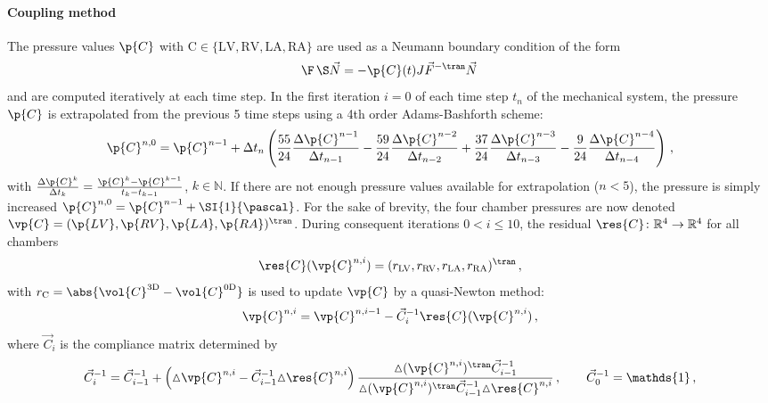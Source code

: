 \paragraph{Coupling method} The pressure values $\p{C}$ with $\mathrm{C} \in \{\mathrm{LV,RV,LA,RA}\}$ are used as a Neumann boundary condition of the form
\begin{equation}
    \F\,\S \vec N = -\p{C}(t) J \vec F^{-\tran} \vec N \,
\end{equation}
and are computed iteratively at each time step.
In the first iteration $i=0$ of each time step $t_n$ of the mechanical system, the pressure $\p{C}$ is extrapolated from the previous 5 time steps using a 4th order Adams-Bashforth scheme:
\begin{equation} 
    \label{eq:circextrapolation}
    \p{C}^{n,0} = \p{C}^{n-1} + \Delta t_n\left(
    \frac{55}{24}\frac{\Delta \p{C}^{n-1}}{\Delta t_{n-1}}
    - \frac{59}{24}\frac{\Delta \p{C}^{n-2}}{\Delta t_{n-2}}
    + \frac{37}{24}\frac{\Delta \p{C}^{n-3}}{\Delta t_{n-3}}
    - \frac{9}{24}\frac{\Delta \p{C}^{n-4}}{\Delta t_{n-4}}
    \right)\,,
\end{equation}
with $\frac{\Delta \p{C}^k}{\Delta t_{k}} = \frac{\p{C}^k - \p{C}^{k-1}}{t_{k}- t_{k-1}}$, $k\in\mathbb{N}$.
If there are not enough pressure values available for extrapolation (\ie $n<5$), the pressure is simply increased $\p{C}^{n,0} = \p{C}^{n-1} + \SI{1}{\pascal}$.
For the sake of brevity, the four chamber pressures are now denoted $\vp{C} = (\p{LV}, \p{RV}, \p{LA}, \p{RA})^\tran$.
During consequent iterations $0 < i \leq 10$, the residual $\res{C}\colon\mathbb{R}^{4}\rightarrow\mathbb{R}^{4}$ for all chambers 
\begin{equation*}
    \res{C}(\vp{C}^{n,i})= (r_\mathrm{LV},r_\mathrm{RV},r_\mathrm{LA},r_\mathrm{RA})^\tran \,,
\end{equation*}
with $r_\mathrm{C} = \abs{\vol{C}^\mathrm{3D} - \vol{C}^\mathrm{0D}}$ is used to update $\vp{C}$ by a quasi-Newton method:
\begin{equation}
    \label{eq:quadinewton}
\vp{C}^{n,i} = \vp{C}^{n,i-1} - \vec C_i^{-1}\res{C}(\vp{C}^{n,i}) \,,
\end{equation}
where $\vec C_i$ is the compliance matrix determined by
\begin{equation*}
\vec C_i^{-1} = \vec C_{i-1}^{-1} + \left({\vartriangle} \vp{C}^{n,i}-\vec C_{i-1}^{-1}
{\vartriangle} \res{C}^{n,i}\right) \frac{{\vartriangle} (\vp{C}^{n,i})^\tran\vec C_{i-1}^{-1}}{{\vartriangle} (\vp{C}^{n,i})^\tran\vec C_{i-1}^{-1}{\vartriangle} \res{C}^{n,i}}\,,\qquad \vec C_0^{-1} = \mathds{1} \,,
\end{equation*} 

